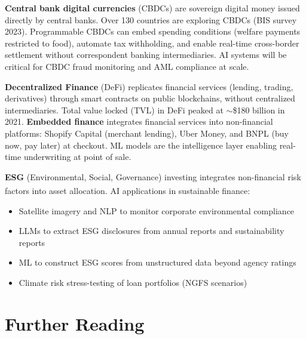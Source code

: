 \begin{tcbitemize}[ skin=sectionraster ]

    \tcbitem[title=CBDCs and Programmable Money, raster multicolumn=3]
    \textbf{Central bank digital currencies} (CBDCs) are sovereign digital money issued directly by central banks.
    Over 130 countries are exploring CBDCs (BIS survey 2023).
    Programmable CBDCs can embed spending conditions (welfare payments restricted to food), automate tax withholding, and enable real-time cross-border settlement without correspondent banking intermediaries.
    AI systems will be critical for CBDC fraud monitoring and AML compliance at scale.

    \tcbitem[title=DeFi and Embedded Finance, raster multicolumn=3]
    \textbf{Decentralized Finance} (DeFi) replicates financial services (lending, trading, derivatives) through smart contracts on public blockchains, without centralized intermediaries.
    Total value locked (TVL) in DeFi peaked at $\sim$\$180 billion in 2021.
    \textbf{Embedded finance} integrates financial services into non-financial platforms: Shopify Capital (merchant lending), Uber Money, and BNPL (buy now, pay later) at checkout.
    ML models are the intelligence layer enabling real-time underwriting at point of sale.

    \tcbitem[title=ESG and Sustainable Finance, raster multicolumn=3]
    \textbf{ESG} (Environmental, Social, Governance) investing integrates non-financial risk factors into asset allocation.
    AI applications in sustainable finance\textsuperscript{\cite[][p.~715]{jansenMachineLearningAlgorithmic2020}}:
    \tcblower
    \begin{itemize}
        \item Satellite imagery and NLP to monitor corporate environmental compliance
        \item LLMs to extract ESG disclosures from annual reports and sustainability reports
        \item ML to construct ESG scores from unstructured data beyond agency ratings
        \item Climate risk stress-testing of loan portfolios (NGFS scenarios)
    \end{itemize}

\end{tcbitemize}

\section{Further Reading}

